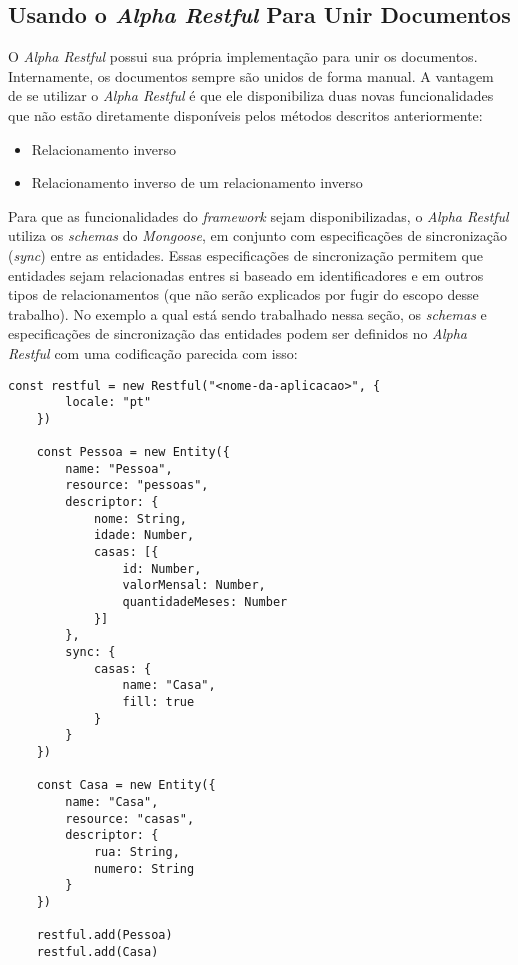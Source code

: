 
\subsection{Usando o \textit{Alpha Restful} Para Unir Documentos}

O \textit{Alpha Restful} possui sua própria implementação para unir os documentos. Internamente, os documentos sempre são unidos de forma manual. A vantagem de se utilizar o \textit{Alpha Restful} é que ele disponibiliza duas novas funcionalidades que não estão diretamente disponíveis pelos métodos descritos anteriormente:

\begin{itemize}
	\item Relacionamento inverso
	\item Relacionamento inverso de um relacionamento inverso
\end{itemize}

Para que as funcionalidades do \textit{framework} sejam disponibilizadas, o \textit{Alpha Restful} utiliza os \textit{schemas} do \textit{Mongoose}, em conjunto com especificações de sincronização (\textit{sync}) entre as entidades. Essas especificações de sincronização permitem que entidades sejam relacionadas entres si baseado em identificadores e em outros tipos de relacionamentos (que não serão explicados por fugir do escopo desse trabalho). No exemplo a qual está sendo trabalhado nessa seção, os \textit{schemas} e especificações de sincronização das entidades podem ser definidos no \textit{Alpha Restful} com uma codificação parecida com isso:

\newpage

\begin{lstlisting}[style=ES6, caption={Definição de \textit{Schemas} no \textit{Alpha Restful}}]
    const restful = new Restful("<nome-da-aplicacao>", {
        locale: "pt"
    })

    const Pessoa = new Entity({
        name: "Pessoa",
        resource: "pessoas",
        descriptor: {
            nome: String,
            idade: Number,
            casas: [{
                id: Number,
                valorMensal: Number,
                quantidadeMeses: Number
            }]
        },
        sync: {
            casas: {
                name: "Casa",
                fill: true
            }
        }
    })
    
    const Casa = new Entity({
        name: "Casa",
        resource: "casas",
        descriptor: {
            rua: String,
            numero: String
        }
    })
    
    restful.add(Pessoa)
    restful.add(Casa)
\end{lstlisting}

